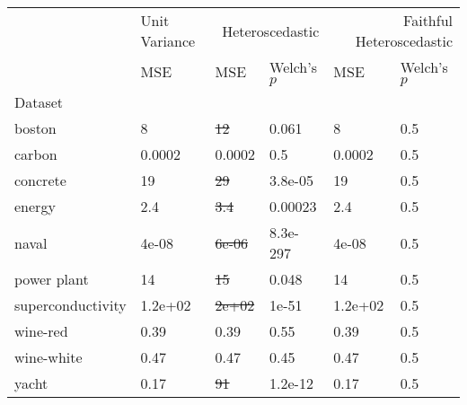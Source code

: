 \begin{tabular}{l|l|ll|ll}
\toprule
 & Unit Variance & \multicolumn{2}{r}{Heteroscedastic} & \multicolumn{2}{r}{Faithful Heteroscedastic} \\
 & MSE & MSE & Welch's $p$ & MSE & Welch's $p$ \\
Dataset &  &  &  &  &  \\
\midrule
boston & 8 & \sout{12} & 0.061 & 8 & 0.5 \\
carbon & 0.0002 & 0.0002 & 0.5 & 0.0002 & 0.5 \\
concrete & 19 & \sout{29} & 3.8e-05 & 19 & 0.5 \\
energy & 2.4 & \sout{3.4} & 0.00023 & 2.4 & 0.5 \\
naval & 4e-08 & \sout{6e-06} & 8.3e-297 & 4e-08 & 0.5 \\
power plant & 14 & \sout{15} & 0.048 & 14 & 0.5 \\
superconductivity & 1.2e+02 & \sout{2e+02} & 1e-51 & 1.2e+02 & 0.5 \\
wine-red & 0.39 & 0.39 & 0.55 & 0.39 & 0.5 \\
wine-white & 0.47 & 0.47 & 0.45 & 0.47 & 0.5 \\
yacht & 0.17 & \sout{91} & 1.2e-12 & 0.17 & 0.5 \\
\bottomrule
\end{tabular}
